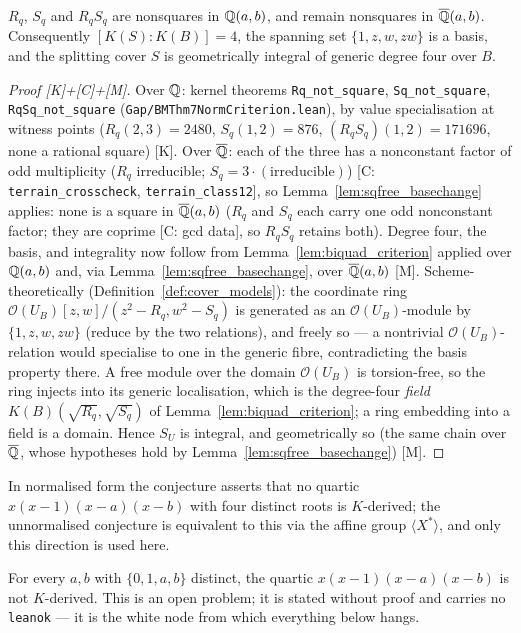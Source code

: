 \begin{proposition}\label{prop:S_integral}
$R_{q}$, $S_{q}$ and $R_{q}S_{q}$ are nonsquares in $\mathbb{Q}(a,b)$, and remain
nonsquares in $\overline{\mathbb{Q}}(a,b)$.  Consequently $[K(S):K(B)]=4$, the spanning
set $\{1,z,w,zw\}$ is a basis, and the splitting cover $S$ is geometrically
integral of generic degree four over $B$.
\end{proposition}
\begin{proof}[Proof {[K]}+{[C]}+{[M]}]
Over $\mathbb{Q}$: kernel theorems \texttt{Rq\_not\_square}, \texttt{Sq\_not\_square},
\texttt{RqSq\_not\_square} (\texttt{Gap/BMThm7NormCriterion.lean}), by value
specialisation at witness points ($R_{q}(2,3)=2480$, $S_{q}(1,2)=876$,
$(R_{q}S_{q})(1,2)=171696$, none a rational square) [K].  Over $\overline{\mathbb{Q}}$:
each of the three has a nonconstant factor of odd multiplicity
($R_{q}$ irreducible; $S_{q}=3\cdot(\text{irreducible})$) [C:
\texttt{terrain\_crosscheck}, \texttt{terrain\_class12}], so Lemma~\ref{lem:sqfree_basechange}
applies: none is a square in $\overline{\mathbb{Q}}(a,b)$ ($R_{q}$ and $S_{q}$ each carry
one odd nonconstant factor; they are coprime [C: gcd data], so $R_{q}S_{q}$
retains both).  Degree four, the basis, and integrality now follow from
Lemma~\ref{lem:biquad_criterion} applied over $\mathbb{Q}(a,b)$ and, via
Lemma~\ref{lem:sqfree_basechange}, over $\overline{\mathbb{Q}}(a,b)$ [M].
Scheme-theoretically (Definition~\ref{def:cover_models}): the coordinate ring
$\mathcal O(U_{B})[z,w]/(z^{2}-R_{q},w^{2}-S_{q})$ is generated as an
$\mathcal O(U_{B})$-module by $\{1,z,w,zw\}$ (reduce by the two relations), and
freely so --- a nontrivial $\mathcal O(U_{B})$-relation would specialise to one
in the generic fibre, contradicting the basis property there.  A free module
over the domain $\mathcal O(U_{B})$ is torsion-free, so the ring injects into
its generic localisation, which is the degree-four \emph{field}
$K(B)(\sqrt{R_{q}},\sqrt{S_{q}})$ of Lemma~\ref{lem:biquad_criterion}; a ring
embedding into a field is a domain.  Hence $S_{U}$ is integral, and
geometrically so (the same chain over $\overline{\mathbb{Q}}$, whose hypotheses hold by
Lemma~\ref{lem:sqfree_basechange}) [M].
\end{proof}  In normalised form the conjecture asserts that no
quartic $x(x-1)(x-a)(x-b)$ with four distinct roots is $K$-derived; the unnormalised
conjecture is equivalent to this via the affine group $\langle X^{*}\rangle$, and only
this direction is used here.

\begin{definition}\label{Conjecture1_normal}
For every $a,b$ with $\{0,1,a,b\}$ distinct, the quartic $x(x-1)(x-a)(x-b)$ is not
$K$-derived.  This is an open problem; it is stated without proof and carries no
\texttt{leanok} --- it is the white node from which everything below hangs.
\end{definition}

